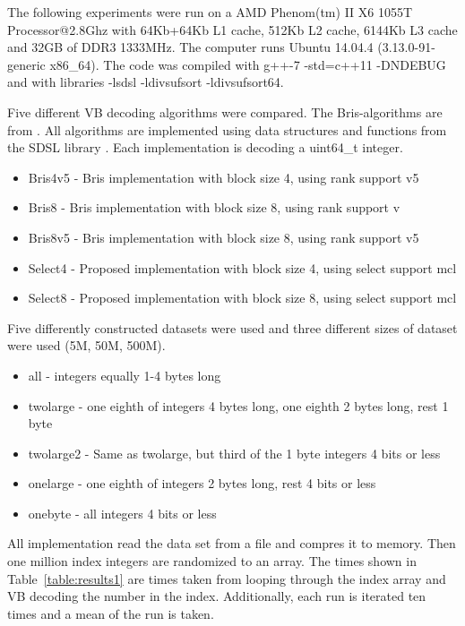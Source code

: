 The following experiments were run on a AMD Phenom(tm) II X6 1055T Processor@2.8Ghz with 64Kb+64Kb L1 cache, 512Kb L2 cache, 6144Kb L3 cache and 32GB of DDR3 1333MHz.
The computer runs Ubuntu 14.04.4 (3.13.0-91-generic x86\_64). The code was compiled with g++-7 -std=c++11 -DNDEBUG and with libraries -lsdsl -ldivsufsort -ldivsufsort64.

Five different VB decoding algorithms were compared. The Bris-algorithms are from \citep{Bri09}. All algorithms are implemented using data structures and functions from the SDSL 
library \citep{gbmp2014sea}. Each implementation is decoding a uint64\_t integer.

\begin{itemize}
  \item Bris4v5 - Bris implementation with block size 4, using rank support v5
  \item Bris8 - Bris implementation with block size 8, using rank support v
  \item Bris8v5 - Bris implementation with block size 8, using rank support v5
  \item Select4 - Proposed implementation with block size 4, using select support mcl
  \item Select8 - Proposed implementation with block size 8, using select support mcl
\end{itemize}






Five differently constructed datasets were used and three different sizes of dataset were used (5M, 50M, 500M). 

\begin{itemize}
  \item all - integers equally 1-4 bytes long
  \item twolarge - one eighth of integers 4 bytes long, one eighth 2 bytes long, rest 1 byte    
  \item twolarge2 - Same as twolarge, but third of the 1 byte integers 4 bits or less
  \item onelarge - one eighth of integers 2 bytes long, rest 4 bits or less
  \item onebyte - all integers 4 bits or less
\end{itemize}

All implementation read the data set from a file and compres it to memory. Then one million index integers are randomized to an array. The times shown in Table~\ref{table:results1} 
are times taken from looping through the index array and VB decoding the number in the index. Additionally, each run is iterated ten times and a mean of the run is taken. 


